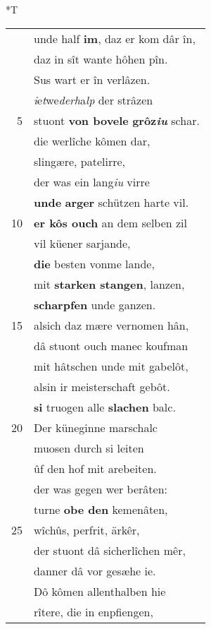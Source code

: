 \documentclass[8pt,a4paper,notitlepage]{article}
\begin{document}
\begin{table}[ht]
\begin{minipage}[t]{0.5\linewidth}
\end{minipage}
\hspace{0.5cm}
\begin{minipage}[t]{0.5\linewidth}
\small
\begin{center}*T
\end{center}
\begin{tabular}{rl}
 & unde half \textbf{im}, daz er kom dâr în,\\ 
 & daz in sît wante hôhen pîn.\\ 
 & Sus wart er în verlâzen.\\ 
 & \textit{i}e\textit{t}we\textit{derh}a\textit{lp} der strâzen\\ 
5 & stuont \textbf{von bovele} \textbf{grôz\textit{iu}} schar.\\ 
 & die werlîche kômen dar,\\ 
 & slingære, patelirre,\\ 
 & der was ein lang\textit{iu} virre\\ 
 & \textbf{unde} \textbf{arger} schützen harte vil.\\ 
10 & \textbf{er kôs ouch} an dem selben zil\\ 
 & vil küener sarjande,\\ 
 & \textbf{die} besten vonme lande,\\ 
 & mit \textbf{starken stangen}, lanzen,\\ 
 & \textbf{scharpfen} unde ganzen.\\ 
15 & alsich daz mære vernomen hân,\\ 
 & dâ stuont ouch manec koufman\\ 
 & mit hâtschen unde mit gabelôt,\\ 
 & alsin ir meisterschaft gebôt.\\ 
 & \textbf{si} truogen alle \textbf{slachen} balc.\\ 
20 & Der küneginne marschalc\\ 
 & muosen durch si leiten\\ 
 & ûf den hof mit arebeiten.\\ 
 & der was gegen wer berâten:\\ 
 & turne \textbf{obe den} kemenâten,\\ 
25 & wîchûs, perfrit, ärkêr,\\ 
 & der stuont dâ sicherlîchen mêr,\\ 
 & danner dâ vor gesæhe ie.\\ 
 & Dô kômen allenthalben hie\\ 
 & rîtere, die in enpfiengen,\\ 

\end{tabular}
\end{minipage}
\end{table}
\end{document}

